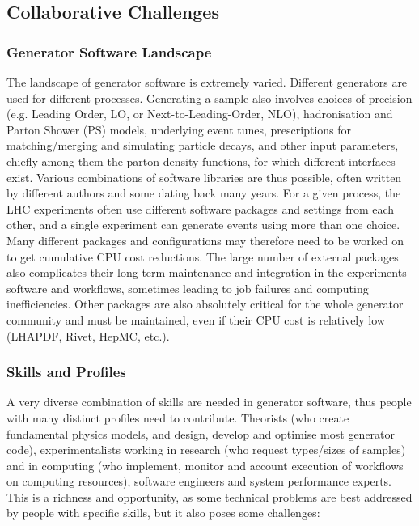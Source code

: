 \documentclass[11pt,a4paper]{article}
\begin{document}
\hypertarget{collaboration-challenges}{%
\subsection{Collaborative Challenges}\label{collaboration-challenges}}

\subsubsection{Generator Software Landscape} 

The landscape of generator software is extremely varied. Different
generators are used for different processes. Generating a sample also
involves choices of precision (e.g. Leading Order, LO, or
Next-to-Leading-Order, NLO), hadronisation and Parton Shower (PS)
models, underlying event tunes, prescriptions for matching/merging and
simulating particle decays, and other input parameters, chiefly among
them the parton density functions, for which different interfaces exist.
Various combinations of software libraries are thus possible, often
written by different authors and some dating back many years. For a
given process, the LHC experiments often use different software packages
and settings from each other, and a single experiment can generate
events using more than one choice. Many different packages and
configurations may therefore need to be worked on to get cumulative CPU
cost reductions. The large number of external packages also complicates
their long-term maintenance and integration in the experiments software
and workflows, sometimes leading to job failures and computing
inefficiencies. Other packages are also absolutely critical for the
whole generator community and must be maintained, even if their CPU cost
is relatively low (LHAPDF, Rivet, HepMC, etc.).

\subsubsection{Skills and Profiles}

A very diverse combination of skills are needed in generator software,
thus people with many distinct profiles need to contribute. Theorists
(who create fundamental physics models, and design, develop and optimise
most generator code), experimentalists working in research (who request
types/sizes of samples) and in computing (who implement, monitor and
account execution of workflows on computing resources), software
engineers and system performance experts. This is a richness and
opportunity, as some technical problems are best addressed by people
with specific skills, but it also poses some challenges:
\end{document}
